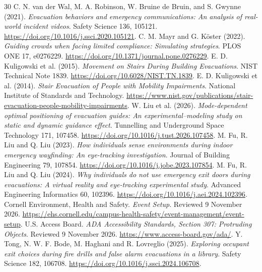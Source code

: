 \documentclass[11pt,a4paper]{article}
\begin{document}
\begin{thebibliography}{30}
 C. N. van der Wal, M. A. Robinson, W. Bruine de Bruin, and S. Gwynne (2021). \emph{Evacuation behaviors and emergency communications: An analysis of real-world incident videos}. Safety Science 136, 105121. \url{https://doi.org/10.1016/j.ssci.2020.105121}.
 C. M. Mayr and G. K\"oster (2022). \emph{Guiding crowds when facing limited compliance: Simulating strategies}. PLOS ONE 17, e0276229. \url{https://doi.org/10.1371/journal.pone.0276229}.
 E. D. Kuligowski et al. (2015). \emph{Movement on Stairs During Building Evacuations}. NIST Technical Note 1839. \url{https://doi.org/10.6028/NIST.TN.1839}.
 E. D. Kuligowski et al. (2014). \emph{Stair Evacuation of People with Mobility Impairments}. National Institute of Standards and Technology. \url{https://www.nist.gov/publications/stair-evacuation-people-mobility-impairments}.
 W. Liu et al. (2026). \emph{Mode-dependent optimal positioning of evacuation guides: An experimental--modeling study on static and dynamic guidance effect}. Tunnelling and Underground Space Technology 171, 107458. \url{https://doi.org/10.1016/j.tust.2026.107458}.
 M. Fu, R. Liu and Q. Liu (2023). \emph{How individuals sense environments during indoor emergency wayfinding: An eye-tracking investigation}. Journal of Building Engineering 79, 107854. \url{https://doi.org/10.1016/j.jobe.2023.107854}.
 M. Fu, R. Liu and Q. Liu (2024). \emph{Why individuals do not use emergency exit doors during evacuations: A virtual reality and eye-tracking experimental study}. Advanced Engineering Informatics 60, 102396. \url{https://doi.org/10.1016/j.aei.2024.102396}.
 Cornell Environment, Health and Safety. \emph{Event Setup}. Reviewed 9 November 2026. \url{https://ehs.cornell.edu/campus-health-safety/event-management/event-setup}.
 U.S. Access Board. \emph{ADA Accessibility Standards, Section 307: Protruding Objects}. Reviewed 9 November 2026. \url{https://www.access-board.gov/ada/}.
 Y. Tong, N. W. F. Bode, M. Haghani and R. Lovreglio (2025). \emph{Exploring occupant exit choices during fire drills and false alarm evacuations in a library}. Safety Science 182, 106708. \url{https://doi.org/10.1016/j.ssci.2024.106708}.
\end{thebibliography}
\end{document}
